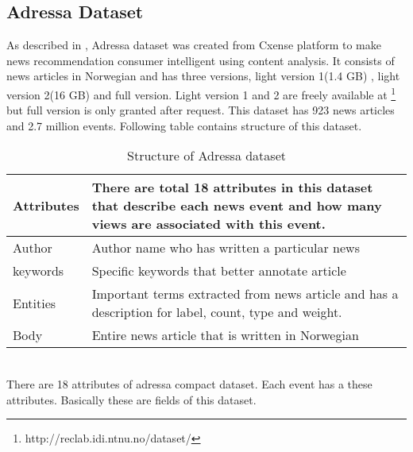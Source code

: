\subsection{Adressa Dataset}
As described in \cite{Adressa}, Adressa dataset was created from Cxense platform to make news recommendation consumer intelligent using content analysis. It consists of news articles in Norwegian and has three versions, light version 1(1.4 GB) , light version 2(16 GB) and full version. Light version 1 and 2 are freely available at \footnote{http://reclab.idi.ntnu.no/dataset/} but full version is only granted after request. This dataset has 923 news articles and 2.7 million events. Following table contains structure of this dataset.
\\
\begin{table}[!htbp] 
\centering
\footnotesize
\def\arraystretch{1.4}%
\centering
\begin{tabular}{|p{2cm}|p{8cm}|}
\hline
Attributes & There are total 18 attributes in this dataset that describe each news event and how many views are associated with this event.
\\
\hline 
Author & Author name who has written a particular news
\\
\hline 
keywords & Specific keywords that better annotate article 
\\
\hline 
Entities & Important terms extracted from news article and has a description for label, count, type and weight.
\\
\hline
Body & Entire news article that is written in Norwegian
\\
\hline
\end{tabular}

\caption{Structure of Adressa dataset}
\label{table:4}
\end{table}
\\
There are 18 attributes of adressa compact dataset. Each event has a these attributes. Basically these are fields of this dataset. 
\\
